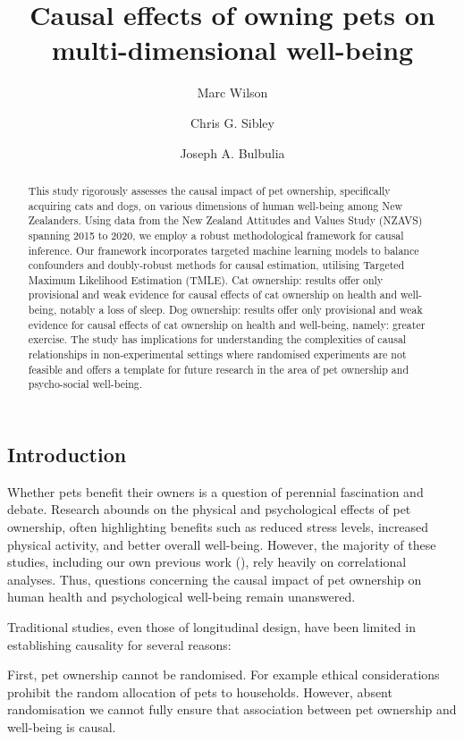 \documentclass[
  singlecolumn,
  9pt]{article}
\title{Causal effects of owning pets on multi-dimensional well-being}
\author{Marc Wilson}
\affil{%
                  Victoria University of Wellington, New Zealand
              }
\author{Chris G. Sibley}
\affil{%
                  School of Psychology, University of Auckland
              }
\author{Joseph A. Bulbulia}
\affil{%
                  Victoria University of Wellington, New Zealand
              }
\date{}
\begin{document}
\maketitle
\begin{abstract}
This study rigorously assesses the causal impact of pet ownership,
specifically acquiring cats and dogs, on various dimensions of human
well-being among New Zealanders. Using data from the New Zealand
Attitudes and Values Study (NZAVS) spanning 2015 to 2020, we employ a
robust methodological framework for causal inference. Our framework
incorporates targeted machine learning models to balance confounders and
doubly-robust methods for causal estimation, utilising Targeted Maximum
Likelihood Estimation (TMLE). Cat ownership: results offer only
provisional and weak evidence for causal effects of cat ownership on
health and well-being, notably a loss of sleep. Dog ownership: results
offer only provisional and weak evidence for causal effects of cat
ownership on health and well-being, namely: greater exercise. The study
has implications for understanding the complexities of causal
relationships in non-experimental settings where randomised experiments
are not feasible and offers a template for future research in the area
of pet ownership and psycho-social well-being.
\end{abstract}
\subsection{Introduction}\label{introduction}

Whether pets benefit their owners is a question of perennial fascination
and debate. Research abounds on the physical and psychological effects
of pet ownership, often highlighting benefits such as reduced stress
levels, increased physical activity, and better overall well-being.
However, the majority of these studies, including our own previous work
(), rely heavily on
correlational analyses. Thus, questions concerning the causal impact of
pet ownership on human health and psychological well-being remain
unanswered.

Traditional studies, even those of longitudinal design, have been
limited in establishing causality for several reasons:

First, pet ownership cannot be randomised. For example ethical
considerations prohibit the random allocation of pets to households.
However, absent randomisation we cannot fully ensure that association
between pet ownership and well-being is causal.
\end{document}
